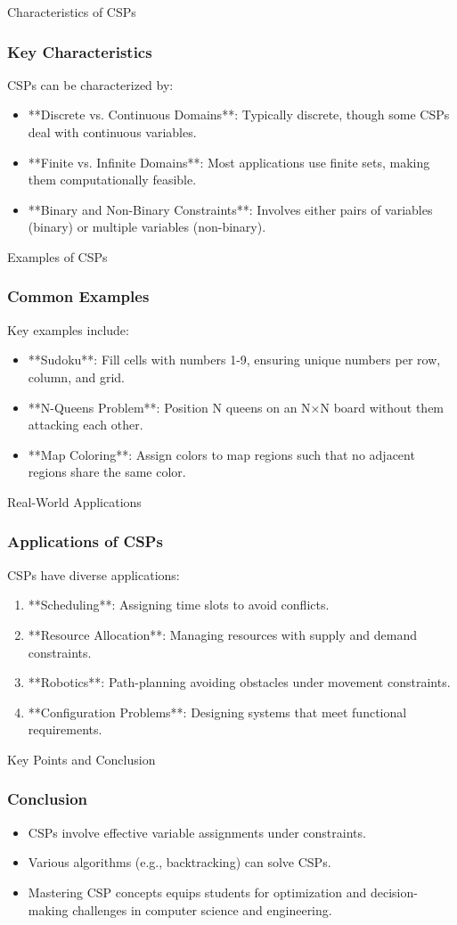 \documentclass[aspectratio=169]{beamer}
\begin{document}
\begin{frame}[fragile]{Characteristics of CSPs}
    \frametitle{Key Characteristics}
    CSPs can be characterized by:
    \begin{itemize}
        \item **Discrete vs. Continuous Domains**: Typically discrete, though some CSPs deal with continuous variables.
        \item **Finite vs. Infinite Domains**: Most applications use finite sets, making them computationally feasible.
        \item **Binary and Non-Binary Constraints**: Involves either pairs of variables (binary) or multiple variables (non-binary).
    \end{itemize}
\end{frame}

\begin{frame}[fragile]{Examples of CSPs}
    \frametitle{Common Examples}
    Key examples include:
    \begin{itemize}
        \item **Sudoku**: Fill cells with numbers 1-9, ensuring unique numbers per row, column, and grid.
        \item **N-Queens Problem**: Position N queens on an N×N board without them attacking each other.
        \item **Map Coloring**: Assign colors to map regions such that no adjacent regions share the same color.
    \end{itemize}
\end{frame}

\begin{frame}[fragile]{Real-World Applications}
    \frametitle{Applications of CSPs}
    CSPs have diverse applications:
    \begin{enumerate}
        \item **Scheduling**: Assigning time slots to avoid conflicts.
        \item **Resource Allocation**: Managing resources with supply and demand constraints.
        \item **Robotics**: Path-planning avoiding obstacles under movement constraints.
        \item **Configuration Problems**: Designing systems that meet functional requirements.
    \end{enumerate}
\end{frame}

\begin{frame}[fragile]{Key Points and Conclusion}
    \frametitle{Conclusion}
    \begin{itemize}
        \item CSPs involve effective variable assignments under constraints.
        \item Various algorithms (e.g., backtracking) can solve CSPs.
        \item Mastering CSP concepts equips students for optimization and decision-making challenges in computer science and engineering.
    \end{itemize}
\end{frame}
\end{document}
